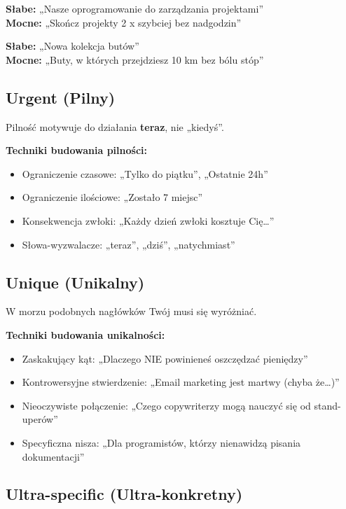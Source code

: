 \documentclass[
  12pt,
  a4paper,
  twoside,
  openright,
  12pt,
  DIV=12,
  BCOR=12mm]{scrbook}
\providecommand{\tightlist}{%
  \setlength{\itemsep}{0pt}\setlength{\parskip}{0pt}}\usepackage{longtable,booktabs,array}
\begin{document}
\textbf{Słabe:} „Nasze oprogramowanie do zarządzania projektami''\\
\textbf{Mocne:} „Skończ projekty 2 x szybciej bez nadgodzin''

\textbf{Słabe:} „Nowa kolekcja butów''\\
\textbf{Mocne:} „Buty, w których przejdziesz 10 km bez bólu stóp''

\subsection{Urgent (Pilny)}\label{urgent-pilny}

Pilność motywuje do działania \textbf{teraz}, nie „kiedyś''.

\textbf{Techniki budowania pilności:}

\begin{itemize}
\tightlist
\item
  Ograniczenie czasowe: „Tylko do piątku'', „Ostatnie 24h''
\item
  Ograniczenie ilościowe: „Zostało 7 miejsc''
\item
  Konsekwencja zwłoki: „Każdy dzień zwłoki kosztuje Cię\ldots''
\item
  Słowa-wyzwalacze: „teraz'', „dziś'', „natychmiast''
\end{itemize}

\subsection{Unique (Unikalny)}\label{unique-unikalny}

W morzu podobnych nagłówków Twój musi się wyróżniać.

\textbf{Techniki budowania unikalności:}

\begin{itemize}
\tightlist
\item
  Zaskakujący kąt: „Dlaczego NIE powinieneś oszczędzać pieniędzy''
\item
  Kontrowersyjne stwierdzenie: „Email marketing jest martwy (chyba
  że\ldots)''
\item
  Nieoczywiste połączenie: „Czego copywriterzy mogą nauczyć się od
  stand-uperów''
\item
  Specyficzna nisza: „Dla programistów, którzy nienawidzą pisania
  dokumentacji''
\end{itemize}

\subsection{Ultra-specific
(Ultra-konkretny)}\label{ultra-specific-ultra-konkretny}
\end{document}
